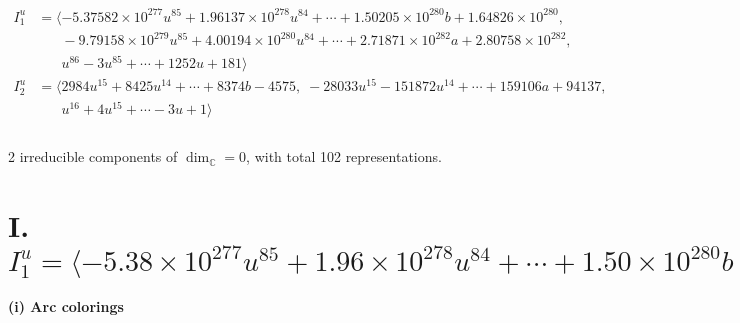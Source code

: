 \documentclass[1p]{elsarticle_modified}
\theoremstyle{definition}
\begin{document}
\begin{align*}
I^u_{1}&=\langle 
-5.37582\times10^{277} u^{85}+1.96137\times10^{278} u^{84}+\cdots+1.50205\times10^{280} b+1.64826\times10^{280},\\
\phantom{I^u_{1}}&\phantom{= \langle  }-9.79158\times10^{279} u^{85}+4.00194\times10^{280} u^{84}+\cdots+2.71871\times10^{282} a+2.80758\times10^{282},\\
\phantom{I^u_{1}}&\phantom{= \langle  }u^{86}-3 u^{85}+\cdots+1252 u+181\rangle \\
I^u_{2}&=\langle 
2984 u^{15}+8425 u^{14}+\cdots+8374 b-4575,\;-28033 u^{15}-151872 u^{14}+\cdots+159106 a+94137,\\
\phantom{I^u_{2}}&\phantom{= \langle  }u^{16}+4 u^{15}+\cdots-3 u+1\rangle \\
\\
\end{align*}
\raggedright * 2 irreducible components of $\dim_{\mathbb{C}}=0$, with total 102 representations.\\
\newpage
\renewcommand{\arraystretch}{1}
\centering \section*{I. $I^u_{1}= \langle -5.38\times10^{277} u^{85}+1.96\times10^{278} u^{84}+\cdots+1.50\times10^{280} b+1.65\times10^{280},\;-9.79\times10^{279} u^{85}+4.00\times10^{280} u^{84}+\cdots+2.72\times10^{282} a+2.81\times10^{282},\;u^{86}-3 u^{85}+\cdots+1252 u+181 \rangle$}
\flushleft \textbf{(i) Arc colorings}\\
\end{document}
